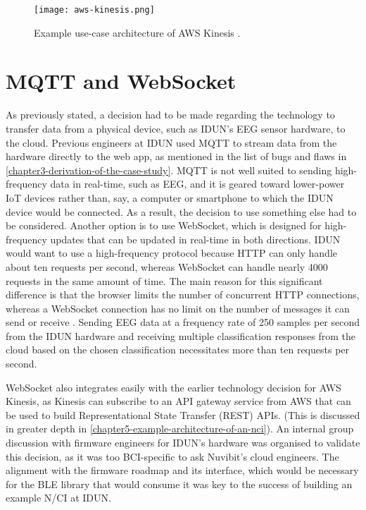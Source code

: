 \begin{figure}[!ht]
  \centering
  \texttt{[image: aws-kinesis.png]}
  \caption[Example use-case architecture of AWS Kinesis]{Example use-case architecture of AWS Kinesis \citep{amazon_web_services_inc_amazon_nodate}.}
  \label{fig:aws-kinesis}
\end{figure}

\section*{MQTT and WebSocket}
\label{chapter4-mqtt-and-websocket}

As previously stated, a decision had to be made regarding the technology to transfer data from a physical device, such as IDUN’s EEG sensor hardware, to the cloud. Previous engineers at IDUN used MQTT to stream data from the hardware directly to the web app, as mentioned in the list of bugs and flaws in \autoref{chapter3-derivation-of-the-case-study}. MQTT is not well suited to sending high-frequency data in real-time, such as EEG, and it is geared toward lower-power IoT devices rather than, say, a computer or smartphone to which the IDUN device would be connected. As a result, the decision to use something else had to be considered. Another option is to use WebSocket, which is designed for high-frequency updates that can be updated in real-time in both directions. IDUN would want to use a high-frequency protocol because HTTP can only handle about ten requests per second, whereas WebSocket can handle nearly 4000 requests in the same amount of time. The main reason for this significant difference is that the browser limits the number of concurrent HTTP connections, whereas a WebSocket connection has no limit on the number of messages it can send or receive \citep{luecke_http_2018}. Sending EEG data at a frequency rate of 250 samples per second from the IDUN hardware and receiving multiple classification responses from the cloud based on the chosen classification necessitates more than ten requests per second.

WebSocket also integrates easily with the earlier technology decision for AWS Kinesis, as Kinesis can subscribe to an API gateway service from AWS that can be used to build Representational State Transfer (REST) APIs. (This is discussed in greater depth in \autoref{chapter5-example-architecture-of-an-nci}). An internal group discussion with firmware engineers for IDUN’s hardware was organised to validate this decision, as it was too BCI-specific to ask Nuvibit’s cloud engineers. The alignment with the firmware roadmap and its interface, which would be necessary for the BLE library that would consume it was key to the success of building an example N/CI at IDUN.

